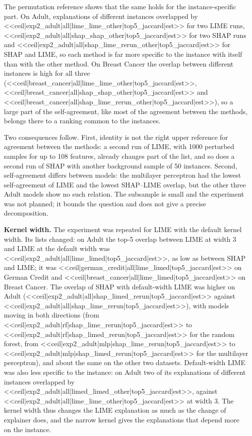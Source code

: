 \documentclass{cys}
\begin{document}
The permutation reference shows that the same holds for the instance-specific part. On
Adult, explanations of different instances overlapped by <<ceil|exp2_adult|all|lime_lime_other|top5_jaccard|est>> for two
LIME runs, <<ceil|exp2_adult|all|shap_shap_other|top5_jaccard|est>> for two SHAP runs and <<ceil|exp2_adult|all|shap_lime_rerun_other|top5_jaccard|est>>
for SHAP and LIME, so each method is far more specific to the instance with itself than
with the other method. On Breast Cancer the overlap between different instances is high
for all three
(<<ceil|breast_cancer|all|lime_lime_other|top5_jaccard|est>>, <<ceil|breast_cancer|all|shap_shap_other|top5_jaccard|est>> and <<ceil|breast_cancer|all|shap_lime_rerun_other|top5_jaccard|est>>),
so a large part of the self-agreement, like most of the agreement between the methods,
belongs there to a ranking common to the instances.

Two consequences follow. First, identity is not the right upper reference for agreement
between the methods: a second run of LIME, with 1000 perturbed samples for up to 108
features, already changes part of the list, and so does a second run of SHAP with another
background sample of 50 instances. Second, self-agreement differs between models: the
multilayer perceptron had the lowest self-agreement of LIME and the lowest SHAP--LIME
overlap, but the other three Adult models show no such relation. The
subsample is small and the experiment was not planned; it bounds the question and does not
give a precise decomposition.

\textbf{Kernel width.} The experiment was repeated for LIME with the default kernel
width. Its lists changed: on Adult the top-5 overlap between LIME at width 3 and LIME at
the default width was <<ceil|exp2_adult|all|lime_limed|top5_jaccard|est>>, as low as between SHAP and LIME; it was
<<ceil|german_credit|all|lime_limed|top5_jaccard|est>> on German Credit and <<ceil|breast_cancer|all|lime_limed|top5_jaccard|est>> on Breast Cancer. The
overlap of SHAP with default-width LIME was higher on Adult (<<ceil|exp2_adult|all|shap_limed_rerun|top5_jaccard|est>>
against <<ceil|exp2_adult|all|shap_lime_rerun|top5_jaccard|est>>), with models moving in both directions (from
<<ceil|exp2_adult|rf|shap_lime_rerun|top5_jaccard|est>> to <<ceil|exp2_adult|rf|shap_limed_rerun|top5_jaccard|est>> for the random forest,
from <<ceil|exp2_adult|mlp|shap_lime_rerun|top5_jaccard|est>> to <<ceil|exp2_adult|mlp|shap_limed_rerun|top5_jaccard|est>> for the
multilayer perceptron), and about the same on the other two datasets. Default-width LIME
was also less specific to the instance: on Adult two of its explanations of different
instances overlapped by <<ceil|exp2_adult|all|limed_limed_other|top5_jaccard|est>>, against <<ceil|exp2_adult|all|lime_lime_other|top5_jaccard|est>> at
width 3. The kernel width thus changes the LIME explanation as much as the change of
explainer does, and the narrow kernel gives the explanations that depend more on the
instance.
\end{document}
